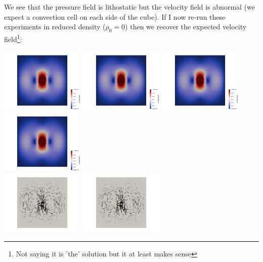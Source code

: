 We see that the pressure field is lithostatic but the velocity field is abnormal 
(we expect a convection cell on each side of the cube).
If I now re-run these experiments in reduced density ($\rho_0=0$) then we recover
the expected velocity field\footnote{Not saying it is 'the' solution but it at least makes sense}:

\begin{center}
\includegraphics[width=4cm]{python_codes/fieldstone_77/results/block/reduced/vel1}
\includegraphics[width=4cm]{python_codes/fieldstone_77/results/block/reduced/vel2}
\includegraphics[width=4cm]{python_codes/fieldstone_77/results/block/reduced/vel3}
\includegraphics[width=4cm]{python_codes/fieldstone_77/results/block/reduced/vel4}\\
\includegraphics[width=4cm]{python_codes/fieldstone_77/results/block/reduced/vels1}
\includegraphics[width=4cm]{python_codes/fieldstone_77/results/block/reduced/vels2}

\end{center}
